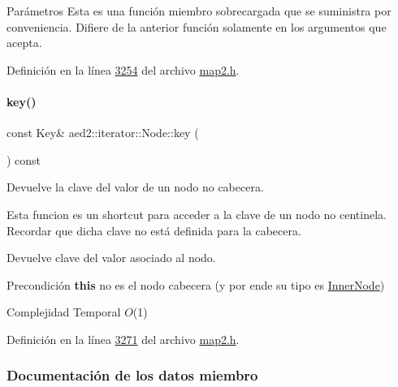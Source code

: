 \begin{DoxyParams}{\-Parámetros}
Esta es una función miembro sobrecargada que se suministra por conveniencia. Difiere de la anterior función solamente en los argumentos que acepta. 

Definición en la línea \hyperlink{map2_8h_source_l03254}{3254} del archivo \hyperlink{map2_8h_source}{map2.\+h}.

\mbox{\label{structaed2_1_1iterator_1_1Node_ac97fa35ede63ba3d4ba1988b5f16cc00_ac97fa35ede63ba3d4ba1988b5f16cc00}} 
\paragraph{\texorpdfstring{key()}{key()}}
{\footnotesize\ttfamily const Key\& aed2\+::iterator\+::\+Node\+::key (\begin{DoxyParamCaption}{ }\end{DoxyParamCaption}) const\hspace{0.3cm}{\ttfamily [inline]}}



Devuelve la clave del valor de un nodo no cabecera. 

Esta funcion es un shortcut para acceder a la clave de un nodo no centinela. Recordar que dicha clave no está definida para la cabecera.

\begin{DoxyReturn}{Devuelve}
clave del valor asociado al nodo.
\end{DoxyReturn}
\begin{DoxyPrecond}{Precondición}
{\bfseries this} no es el nodo cabecera (y por ende su tipo es \hyperlink{structaed2_1_1iterator_1_1InnerNode}{Inner\+Node})
\end{DoxyPrecond}

\begin{DoxyDescription}
\item[Complejidad Temporal]$O$(1)
\end{DoxyDescription}

Definición en la línea \hyperlink{map2_8h_source_l03271}{3271} del archivo \hyperlink{map2_8h_source}{map2.\+h}.



\subsubsection{Documentación de los datos miembro}
\mbox{\label{structaed2_1_1iterator_1_1Node_aaf0597e2d3402329e0c30db030777f04_aaf0597e2d3402329e0c30db030777f04}} 

\end{DoxyParams}
